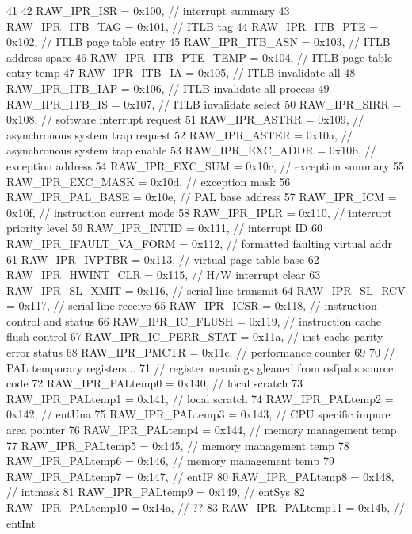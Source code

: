 \begin{DoxyCode}
41                   {
42     RAW_IPR_ISR = 0x100,            // interrupt summary
43     RAW_IPR_ITB_TAG = 0x101,        // ITLB tag
44     RAW_IPR_ITB_PTE = 0x102,        // ITLB page table entry
45     RAW_IPR_ITB_ASN = 0x103,        // ITLB address space
46     RAW_IPR_ITB_PTE_TEMP = 0x104,   // ITLB page table entry temp
47     RAW_IPR_ITB_IA = 0x105,         // ITLB invalidate all
48     RAW_IPR_ITB_IAP = 0x106,        // ITLB invalidate all process
49     RAW_IPR_ITB_IS = 0x107,         // ITLB invalidate select
50     RAW_IPR_SIRR = 0x108,           // software interrupt request
51     RAW_IPR_ASTRR = 0x109,          // asynchronous system trap request
52     RAW_IPR_ASTER = 0x10a,          // asynchronous system trap enable
53     RAW_IPR_EXC_ADDR = 0x10b,       // exception address
54     RAW_IPR_EXC_SUM = 0x10c,        // exception summary
55     RAW_IPR_EXC_MASK = 0x10d,       // exception mask
56     RAW_IPR_PAL_BASE = 0x10e,       // PAL base address
57     RAW_IPR_ICM = 0x10f,            // instruction current mode
58     RAW_IPR_IPLR = 0x110,           // interrupt priority level
59     RAW_IPR_INTID = 0x111,          // interrupt ID
60     RAW_IPR_IFAULT_VA_FORM = 0x112, // formatted faulting virtual addr
61     RAW_IPR_IVPTBR = 0x113,         // virtual page table base
62     RAW_IPR_HWINT_CLR = 0x115,      // H/W interrupt clear
63     RAW_IPR_SL_XMIT = 0x116,        // serial line transmit
64     RAW_IPR_SL_RCV = 0x117,         // serial line receive
65     RAW_IPR_ICSR = 0x118,           // instruction control and status
66     RAW_IPR_IC_FLUSH = 0x119,       // instruction cache flush control
67     RAW_IPR_IC_PERR_STAT = 0x11a,   // inst cache parity error status
68     RAW_IPR_PMCTR = 0x11c,          // performance counter
69 
70     // PAL temporary registers...
71     // register meanings gleaned from osfpal.s source code
72     RAW_IPR_PALtemp0 = 0x140,       // local scratch
73     RAW_IPR_PALtemp1 = 0x141,       // local scratch
74     RAW_IPR_PALtemp2 = 0x142,       // entUna
75     RAW_IPR_PALtemp3 = 0x143,       // CPU specific impure area pointer
76     RAW_IPR_PALtemp4 = 0x144,       // memory management temp
77     RAW_IPR_PALtemp5 = 0x145,       // memory management temp
78     RAW_IPR_PALtemp6 = 0x146,       // memory management temp
79     RAW_IPR_PALtemp7 = 0x147,       // entIF
80     RAW_IPR_PALtemp8 = 0x148,       // intmask
81     RAW_IPR_PALtemp9 = 0x149,       // entSys
82     RAW_IPR_PALtemp10 = 0x14a,      // ??
83     RAW_IPR_PALtemp11 = 0x14b,      // entInt
}
\end{DoxyCode}
